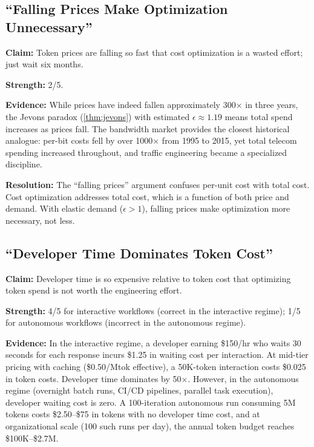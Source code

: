 \documentclass[11pt, a4paper, logo, copyright]{googledeepmind}
\begin{document}
\subsection{``Falling Prices Make Optimization Unnecessary''}

\textbf{Claim:} Token prices are falling so fast that cost optimization is a wasted effort; just wait six months.

\textbf{Strength:} 2/5.

\textbf{Evidence:} While prices have indeed fallen approximately 300$\times$ in three years, the Jevons paradox (\cref{thm:jevons}) with estimated $\epsilon \approx 1.19$ means total spend increases as prices fall. The bandwidth market provides the closest historical analogue: per-bit costs fell by over 1000$\times$ from 1995 to 2015, yet total telecom spending increased throughout, and traffic engineering became a specialized discipline.

\textbf{Resolution:} The ``falling prices'' argument confuses per-unit cost with total cost. Cost optimization addresses total cost, which is a function of both price and demand. With elastic demand ($\epsilon > 1$), falling prices make optimization more necessary, not less.

\subsection{``Developer Time Dominates Token Cost''}

\textbf{Claim:} Developer time is so expensive relative to token cost that optimizing token spend is not worth the engineering effort.

\textbf{Strength:} 4/5 for interactive workflows (correct in the interactive regime); 1/5 for autonomous workflows (incorrect in the autonomous regime).

\textbf{Evidence:} In the interactive regime, a developer earning \$150/hr who waits 30 seconds for each response incurs \$1.25 in waiting cost per interaction. At mid-tier pricing with caching (\$0.50/Mtok effective), a 50K-token interaction costs \$0.025 in token costs. Developer time dominates by 50$\times$. However, in the autonomous regime (overnight batch runs, CI/CD pipelines, parallel task execution), developer waiting cost is zero. A 100-iteration autonomous run consuming 5M tokens costs \$2.50--\$75 in tokens with no developer time cost, and at organizational scale (100 such runs per day), the annual token budget reaches \$100K--\$2.7M.
\end{document}
